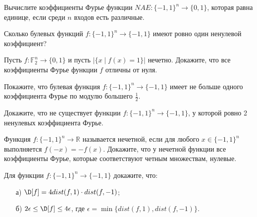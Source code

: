 \begin{task}
    Вычислите коэффициенты Фурье функции $NAE: \{-1, 1\}^n \to \{0, 1\}$, которая равна единице, если среди $n$ входов есть
    различные.
\end{task}


\begin{task}
    Сколько булевых функций $f: \{-1, 1\}^n \to \{-1, 1\}$ имеют ровно один ненулевой коэффициент?
\end{task}

\begin{task}
    Пусть $f: \mathbb{F}_2^n \to \{0, 1\}$ и пусть $|\{x \mid f(x) = 1\}|$ нечетно. Докажите, что все коэффициенты Фурье функции
    $f$ отличны от нуля.
\end{task}


\begin{task}
    Покажите, что булевая функция $f: \{-1, 1\}^n \to \{-1, 1\}$ имеет не больше одного коэффициента Фурье по модулю большего
    $\frac{1}{2}$.
\end{task}


\begin{task}
    Докажите, что не существует функции $f: \{-1, 1\}^n \to \{-1, 1\}$, у которой ровно 2 ненулевых коэффициента Фурье.
\end{task}


\begin{task}
    Функция $f: \{-1, 1\}^n \to \mathbb{R}$ называется нечетной, если для любого $x \in \{-1, 1\}^n$ выполняется $f(-x) =
    -f(x)$. Докажите, что у нечетной функции все коэффициенты Фурье, которые соответствуют четным множествам, нулевые.
\end{task}

\begin{task}
    Для функции $f: \{-1, 1\}^n \to \{-1, 1\}$ докажите, что:
   \begin{enumerate}[topsep = 0pt, itemsep = -1ex]
        \item [а)] $\D[f] = 4 dist(f, 1) \cdot dist(f, -1)$;
        \item [б)] $2 \epsilon \le \D[f] \le 4 \epsilon$, где $\epsilon = \min \{dist(f, 1), dist(f, -1)\}$.
	\end{enumerate}
\end{task}


